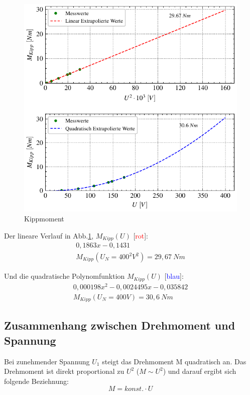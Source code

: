 \documentclass[conference]{IEEEtran}
\begin{document}


\begin{figure}[htbp]
    \centering
    \includegraphics[width=\columnwidth]{./figures/kippmoment.pdf}
    \caption{Kippmoment}
    \label{fig:Kippmoment}
\end{figure}

Der lineare Verlauf in Abb.\ref{fig:Kippmoment}, $M_{\textit{Kipp}}(U)$ [\textcolor{red}{rot}]:
\begin{gather*}
    0,1863 x - 0,1431\\
    M_{Kipp}(U_N=400^2V^2)=29,67 \ \si{Nm}
\end{gather*}

Und die quadratische Polynomfunktion $M_{\textit{Kipp}}(U)$ [\textcolor{blue}{blau}]:
\begin{gather*}
    0,000198 x^2 - 0,0024495 x -0,035842\\
    M_{Kipp}(U_N=400V)=30,6\ \si{Nm}
\end{gather*}



\subsection{Zusammenhang zwischen Drehmoment und Spannung}

Bei zunehmender Spannung $U_1$ steigt das Drehmoment M quadratisch an. Das
Drehmoment ist direkt proportional zu $U^2$ ($M \sim U^2$) und darauf ergibt sich
folgende Beziehnung: \[ M = \textit{konst.} \cdot U \]
\end{document}
